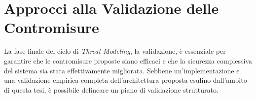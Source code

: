     





    


\section{Approcci alla Validazione delle Contromisure}

La fase finale del ciclo di \textit{Threat Modeling}, la validazione, è essenziale per garantire che le contromisure proposte siano efficaci e che la sicurezza complessiva del sistema sia stata effettivamente migliorata. Sebbene un'implementazione e una validazione empirica completa dell'architettura proposta esulino dall'ambito di questa tesi, è possibile delineare un piano di validazione strutturato.


